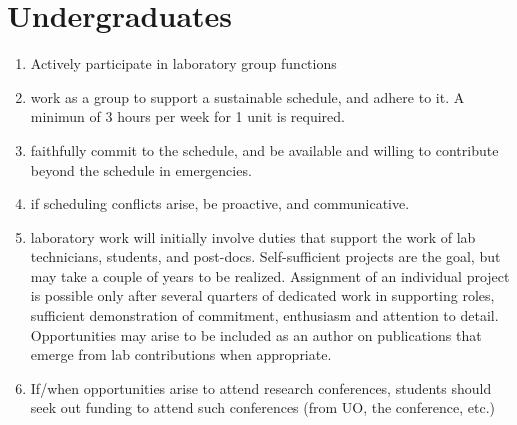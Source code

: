 \documentclass[12pt]{article}
\begin{document}
\section{Undergraduates}
\begin{enumerate}
\item Actively participate in laboratory group functions
\item work as a group to support a sustainable schedule, and adhere to
  it. A minimun of 3 hours per week for 1 unit is required. 
\item faithfully commit to the schedule, and be available and willing
  to contribute beyond the schedule in emergencies.
\item if scheduling conflicts arise, be proactive, and communicative.
\item laboratory work will initially involve duties that support the
  work of lab technicians, students, and post-docs. Self-sufficient
  projects are the goal, but may take a couple of years to be
  realized. Assignment of an individual project is possible only after
  several quarters of dedicated work in supporting roles, sufficient
  demonstration of commitment, enthusiasm and attention to
  detail. Opportunities may arise to be included as an author on
  publications that emerge from lab contributions when appropriate.
\item If/when opportunities arise to attend research conferences, students
  should seek out funding to attend such conferences (from UO, the
  conference, etc.)
\end{enumerate}
\end{document}
